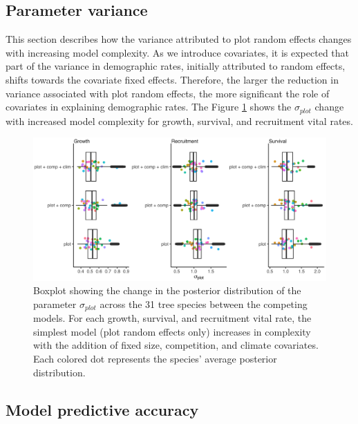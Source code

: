 \hypertarget{parameter-variance}{%
\subsection{Parameter variance}\label{parameter-variance}}

This section describes how the variance attributed to plot random
effects changes with increasing model complexity. As we introduce
covariates, it is expected that part of the variance in demographic
rates, initially attributed to random effects, shifts towards the
covariate fixed effects. Therefore, the larger the reduction in variance
associated with plot random effects, the more significant the role of
covariates in explaining demographic rates. The Figure \ref{fig:par_var_ch2}
shows the \(\sigma_{plot}\) change with increased model complexity for
growth, survival, and recruitment vital rates.\\

\hypertarget{fig:par_var_ch2}{%
\begin{figure}
\centering
\includegraphics{manuscript/figs/supp1_1.png}
\caption[{Boxplot showing the change in the posterior distribution of
the parameter \(\sigma_{plot}\) across the 31 tree species between the
competing models.}]{Boxplot showing the change in the posterior
distribution of the parameter \(\sigma_{plot}\) across the 31 tree
species between the competing models. For each growth, survival, and
recruitment vital rate, the simplest model (plot random effects only)
increases in complexity with the addition of fixed size, competition,
and climate covariates. Each colored dot represents the species' average
posterior distribution.}
\label{fig:par_var_ch2}
\end{figure}
}

\hypertarget{model-predictive-accuracy}{%
\subsection{Model predictive accuracy}\label{model-predictive-accuracy}}

